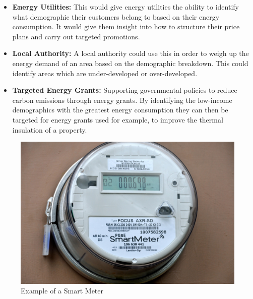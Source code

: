 \begin{itemize}
    \item \textbf{Energy Utilities:} This would give energy utilities the ability to identify what demographic their customers belong to based on their energy consumption. It would give them insight into how to structure their price plans and carry out targeted promotions.
    \item \textbf{Local Authority:} A local authority could use this in order to weigh up the energy demand of an area based on the demographic breakdown. This could identify areas which are under-developed or over-developed.
    \item \textbf{Targeted Energy Grants:} Supporting governmental policies to reduce carbon emissions through energy grants. By identifying the low-income demographics with the greatest energy consumption they can then be targeted for energy grants used for example, to improve the thermal insulation of a property.
    \end{itemize}


        \begin{figure}[H]
        \centering     
        \includegraphics[width=1\textwidth]{Figures/smart-meter-emf-safety-network.jpg}
        \caption{Example of a Smart Meter}
        \label{fig:Daily Consumption}
        \end{figure}
